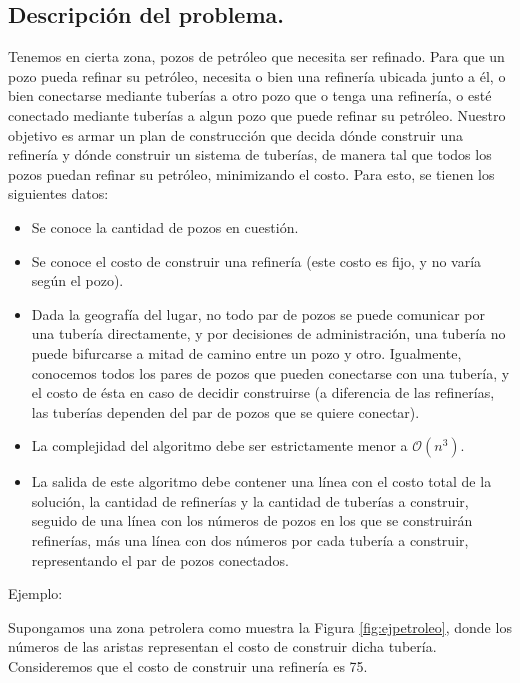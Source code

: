 \subsection{Descripción del problema.}

\vspace*{0.3cm}

Tenemos en cierta zona, pozos de petróleo que necesita ser refinado. Para que un pozo pueda refinar su petróleo, necesita o bien una refinería ubicada junto a él, o bien conectarse mediante tuberías a otro pozo que o tenga una refinería, o esté conectado mediante tuberías a algun pozo que puede refinar su petróleo. Nuestro objetivo es armar un plan de construcción que decida dónde construir una refinería y dónde construir un sistema de tuberías, de manera tal que todos los pozos puedan refinar su petróleo, minimizando el costo. Para esto, se tienen los siguientes datos:

\begin{itemize}
	\item Se conoce la cantidad de pozos en cuestión.
	\item Se conoce el costo de construir una refinería (este costo es fijo, y no varía según el pozo).
	\item Dada la geografía del lugar, no todo par de pozos se puede comunicar por una tubería directamente, y por decisiones de administración, una tubería no puede bifurcarse a mitad de camino entre un pozo y otro. Igualmente, conocemos todos los pares de pozos que pueden conectarse con una tubería, y el costo de ésta en caso de decidir construirse (a diferencia de las refinerías, las tuberías dependen del par de pozos que se quiere conectar).
	\item La complejidad del algoritmo debe ser estrictamente menor a $\mathcal{O}(n^3)$.
	\item La salida de este algoritmo debe contener una línea con el costo total de la solución, la cantidad de refinerías y la cantidad de tuberías a construir, seguido de una línea con los números de pozos en los que se construirán refinerías, más una línea con dos números por cada tubería a construir, representando el par de pozos conectados.	
\end{itemize}

Ejemplo:

Supongamos una zona petrolera como muestra la Figura \ref{fig:ejpetroleo}, donde los números de las aristas representan el costo de construir dicha tubería. Consideremos que el costo de construir una refinería es 75.

